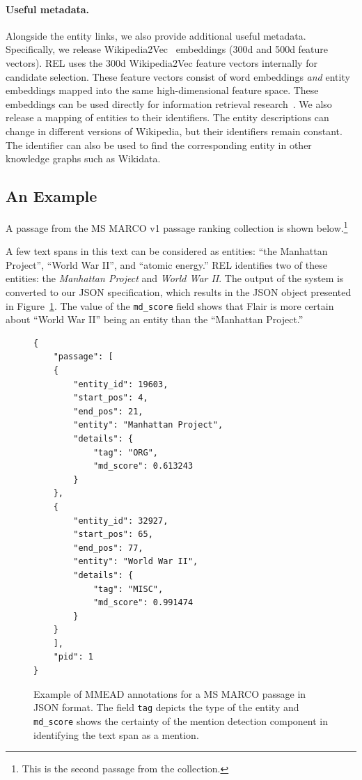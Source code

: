 \paragraph{Useful metadata.} Alongside the entity links, we also provide additional useful metadata. Specifically, we release Wikipedia2Vec~\citep{wikipedia2vec} embeddings (300d and 500d feature vectors). REL uses the 300d Wikipedia2Vec feature vectors internally for candidate selection. These feature vectors consist of word embeddings \emph{and} entity embeddings mapped into the same high-dimensional feature space. These embeddings can be used directly for information retrieval research~\citep{Gerritse:2020:GEER, Gerritse:2022:EMBERT}. We also release a mapping of entities to their identifiers. The entity descriptions can change in different versions of Wikipedia, but their identifiers remain constant.
The identifier can also be used to find the corresponding entity in other knowledge graphs such as Wikidata.

\subsection{An Example}
A passage from the MS MARCO v1 passage ranking collection is shown below.\footnote{This is the second passage from the collection.}

\smallskip
\begin{center}
\end{center}
\smallskip

A few text spans in this text can be considered as entities: ``the Manhattan Project'', ``World War II'', and ``atomic energy.'' REL identifies two of these entities: the \emph{Manhattan Project} and \emph{World War II}. 
The output of the system is converted to our JSON specification, which results in the JSON object presented in Figure~\ref{fig:json-example-passage-v1}. The value of the \texttt{md\_score} field shows that Flair is more certain about ``World War II'' being an entity than the ``Manhattan Project.'' 

\begin{figure}
	\begin{verbatim}
{
	"passage": [
	{
		"entity_id": 19603, 
		"start_pos": 4, 
		"end_pos": 21,
		"entity": "Manhattan Project",
		"details": {
			"tag": "ORG",
			"md_score": 0.613243
		}
	}, 
	{
		"entity_id": 32927,
		"start_pos": 65,
		"end_pos": 77,
		"entity": "World War II",
		"details": {
			"tag": "MISC",
			"md_score": 0.991474
		}
	}
	], 
	"pid": 1
}
	\end{verbatim}
\caption{Example of MMEAD annotations for a MS MARCO passage in JSON format. The field \texttt{tag} depicts the type of the entity and \texttt{md\_score} shows the certainty of the mention detection component in identifying the text span as a mention.}
\label{fig:json-example-passage-v1}
\end{figure}

